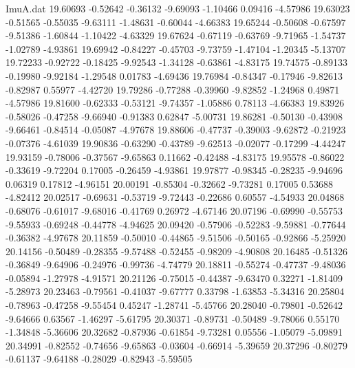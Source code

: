 \begin{filecontents}{ImuA.dat}
  19.60693   -0.52642   -0.36132   -9.69093   -1.10466    0.09416   -4.57986
  19.63023   -0.51565   -0.55035   -9.63111   -1.48631   -0.60044   -4.66383
  19.65244   -0.50608   -0.67597   -9.51386   -1.60844   -1.10422   -4.63329
  19.67624   -0.67119   -0.63769   -9.71965   -1.54737   -1.02789   -4.93861
  19.69942   -0.84227   -0.45703   -9.73759   -1.47104   -1.20345   -5.13707
  19.72233   -0.92722   -0.18425   -9.92543   -1.34128   -0.63861   -4.83175
  19.74575   -0.89133   -0.19980   -9.92184   -1.29548    0.01783   -4.69436
  19.76984   -0.84347   -0.17946   -9.82613   -0.82987    0.55977   -4.42720
  19.79286   -0.77288   -0.39960   -9.82852   -1.24968    0.49871   -4.57986
  19.81600   -0.62333   -0.53121   -9.74357   -1.05886    0.78113   -4.66383
  19.83926   -0.58026   -0.47258   -9.66940   -0.91383    0.62847   -5.00731
  19.86281   -0.50130   -0.43908   -9.66461   -0.84514   -0.05087   -4.97678
  19.88606   -0.47737   -0.39003   -9.62872   -0.21923   -0.07376   -4.61039
  19.90836   -0.63290   -0.43789   -9.62513   -0.02077   -0.17299   -4.44247
  19.93159   -0.78006   -0.37567   -9.65863    0.11662   -0.42488   -4.83175
  19.95578   -0.86022   -0.33619   -9.72204    0.17005   -0.26459   -4.93861
  19.97877   -0.98345   -0.28235   -9.94696    0.06319    0.17812   -4.96151
  20.00191   -0.85304   -0.32662   -9.73281    0.17005    0.53688   -4.82412
  20.02517   -0.69631   -0.53719   -9.72443   -0.22686    0.60557   -4.54933
  20.04868   -0.68076   -0.61017   -9.68016   -0.41769    0.26972   -4.67146
  20.07196   -0.69990   -0.55753   -9.55933   -0.69248   -0.44778   -4.94625
  20.09420   -0.57906   -0.52283   -9.59881   -0.77644   -0.36382   -4.97678
  20.11859   -0.50010   -0.44865   -9.51506   -0.50165   -0.92866   -5.25920
  20.14156   -0.50489   -0.28355   -9.57488   -0.52455   -0.98209   -4.90808
  20.16485   -0.51326   -0.36849   -9.64906   -0.24976   -0.99736   -4.74779
  20.18811   -0.55274   -0.47737   -9.48036   -0.05894   -1.27978   -4.91571
  20.21126   -0.75015   -0.44387   -9.63470    0.32271   -1.81409   -5.28973
  20.23463   -0.79561   -0.41037   -9.67777    0.33798   -1.63853   -5.34316
  20.25804   -0.78963   -0.47258   -9.55454    0.45247   -1.28741   -5.45766
  20.28040   -0.79801   -0.52642   -9.64666    0.63567   -1.46297   -5.61795
  20.30371   -0.89731   -0.50489   -9.78066    0.55170   -1.34848   -5.36606
  20.32682   -0.87936   -0.61854   -9.73281    0.05556   -1.05079   -5.09891
  20.34991   -0.82552   -0.74656   -9.65863   -0.03604   -0.66914   -5.39659
  20.37296   -0.80279   -0.61137   -9.64188   -0.28029   -0.82943   -5.59505

\end{filecontents}

